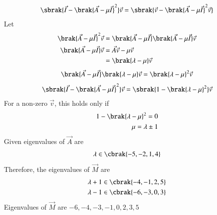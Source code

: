 \documentclass[journal]{IEEEtran}
\begin{document}
\begin{align}
    \sbrak{\vec{I} - \brak{\vec{A} - \mu \vec{I}}^2}\vec{v} = \sbrak{\vec{v} - \brak{\vec{A} - \mu \vec{I}}^2 \vec{v}} 
\end{align}
Let 
\begin{align}
    \brak{\vec{A} - \mu \vec{I}}^2 \vec{v} &= \brak{\vec{A} - \mu \vec{I}} \brak{\vec{A} - \mu \vec{I}} \vec{v}\\
    \brak{\vec{A} - \mu \vec{I}} \vec{v} &= \vec{A} \vec{v} - \mu \vec{v}\\
    &= \brak{\lambda - \mu } \vec{v}
\end{align} 
\begin{align}
    \brak{\vec{A} - \mu \vec{I}} \brak{\lambda - \mu } \vec{v} = \brak{\lambda - \mu}^2 \vec{v}
\end{align}
\begin{align}
    \sbrak{\vec{I} - \brak{\vec{A} - \mu \vec{I}}^2}\vec{v}
= \sbrak{1 - \brak{\lambda - \mu}^2}\vec{v}
\end{align}
For a non-zero $\vec{v}$, this holds only if 
\begin{align}
    1 - \brak{\lambda - \mu}^2 = 0\\
    \mu = \lambda \pm 1
\end{align}
Given eigenvalues of $\vec{A}$ are 
\begin{align}
    \lambda \in \cbrak{-5, -2, 1, 4}
\end{align}
Therefore, the eigenvalues of $\vec{M}$ are
\begin{align}
    \lambda + 1 &\in \cbrak{-4, -1, 2, 5}\\
\lambda - 1 &\in \cbrak{-6, -3, 0, 3}
\end{align}
Eigenvalues of $\vec{M}$ are $-6,-4,-3,-1,0,2,3,5$
\end{document}

